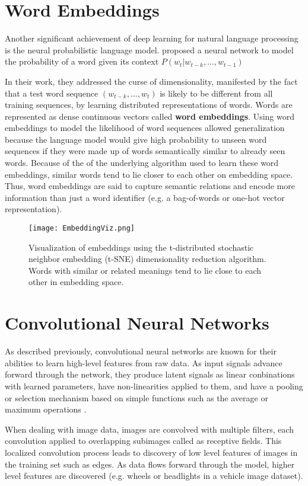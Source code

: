 \section{Word Embeddings}
Another significant achievement of deep learning for natural language processing is the neural probabilistic language model. \cite{bengio2003neural}
proposed a neural network to model the probability of a word given its context
$P(w_t|w_{t-k},\dots,w_{t-1})$

In their work, they addressed the curse of dimensionality, manifested by the fact that a test word sequence $(w_{t-k},\dots,w_{t})$
is likely to be different from all training sequences, by learning distributed representations of words. Words are represented as
dense continuous vectors called \textbf{word embeddings}.
Using word embeddings to model the likelihood of word sequences allowed generalization because the language model
would give high probability to unseen word sequences if they were made up of words semantically similar to already seen words.
Because of the of the underlying algorithm used to learn these word embeddings, similar words tend to lie closer to each other on
embedding space. Thus, word embeddings are said to capture semantic relations and encode more information than just a word identifier (e.g.
a bag-of-words or one-hot vector representation).

\begin{figure}[h]
\caption{Visualization of embeddings using the t-distributed stochastic neighbor embedding (t-SNE) dimensionality reduction algorithm.
Words with similar or related meanings tend to lie close to each other in embedding space.}
\centering
\texttt{[image: EmbeddingViz.png]}
\end{figure}

\section{Convolutional Neural Networks}
As described previously, convolutional neural networks are known for their abilities to learn high-level features from raw data. As input signals advance
forward through the network, they produce latent signals as linear conbinations with learned parameters, have non-linearities applied
to them, and have a pooling or selection mechanism based on simple functions such as the average or maximum operations \cite{zhou1988image}.

When dealing with image data, images are convolved with multiple filters, each convolution applied to overlapping subimages called as receptive fields.
This localized convolution process leads to discovery of low level features of images in the training set such as edges. As data
flows forward through the model, higher level features are discovered (e.g. wheels or headlights in a vehicle image dataset).

